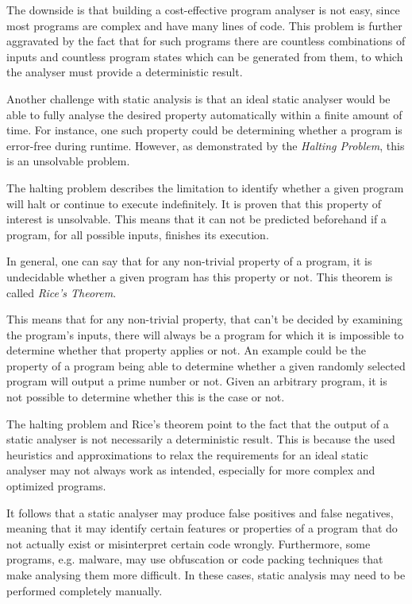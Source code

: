 The downside is that building a cost-effective program analyser is not easy, since most programs are complex and have many lines of code. This problem is further aggravated by the fact that for such programs there are countless combinations of inputs and countless program states which can be generated from them, to which the analyser must provide a deterministic result. \cite[p. 19]{staticanalyze}

Another challenge with static analysis is that an ideal static analyser would be able to fully analyse the desired property automatically within a finite amount of time. For instance, one such property could be determining whether a program is error-free during runtime. However, as demonstrated by the \textit{Halting Problem}, this is an unsolvable problem. \cite[p. 19]{staticanalyze}

The halting problem describes the limitation to identify whether a given program will halt or continue to execute indefinitely. It is proven that this property of interest is unsolvable. \cite[p. 23]{staticanalyze} This means that it can not be predicted beforehand if a program, for all possible inputs, finishes its execution.

In general, one can say that for any non-trivial property of a program, it is undecidable whether a given program has this property or not. This theorem is called \textit{Rice's Theorem}. \cite[p. 24]{staticanalyze}

This means that for any non-trivial property, that can't be decided by examining the program's inputs, there will always be a program for which it is impossible to determine whether that property applies or not. An example could be the property of a program being able to determine whether a given randomly selected program will output a prime number or not. Given an arbitrary program, it is not possible to determine whether this is the case or not.

The halting problem and Rice's theorem point to the fact that the output of a static analyser is not necessarily a deterministic result. This is because the used heuristics and approximations to relax the requirements for an ideal static analyser may not always work as intended, especially for more complex and optimized programs. \cite[p. 24-25]{staticanalyze}

It follows that a static analyser may produce false positives and false negatives, meaning that it may identify certain features or properties of a program that do not actually exist or misinterpret certain code wrongly. \cite[p. 25]{staticanalyze} Furthermore, some programs, e.g. malware, may use obfuscation or code packing techniques that make analysing them more difficult. In these cases, static analysis may need to be performed completely manually. \cite[p. 30]{staticanalyze} \cite[p. 13]{malware}

